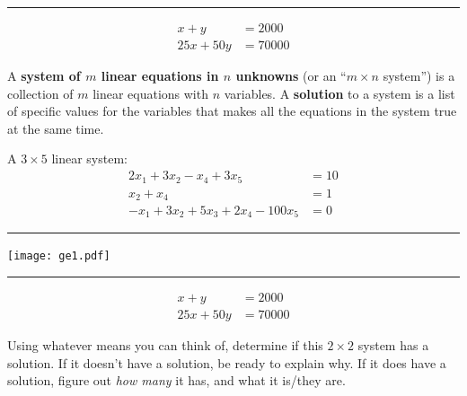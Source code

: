 \documentclass[
  letterpaper,
  DIV=11,
  numbers=noendperiod]{scrartcl}
\begin{document}
\begin{center}\rule{0.5\linewidth}{0.5pt}\end{center}

\[\begin{align*}
x + y &= 2000 \\
25x + 50y &= 70000
\end{align*}\]

\begin{tcolorbox}[enhanced jigsaw, colbacktitle=quarto-callout-note-color!10!white, left=2mm, bottomrule=.15mm, toprule=.15mm, coltitle=black, opacityback=0, colframe=quarto-callout-note-color-frame, colback=white, arc=.35mm, toptitle=1mm, titlerule=0mm, rightrule=.15mm, leftrule=.75mm, breakable, bottomtitle=1mm, title=\textcolor{quarto-callout-note-color}{\faInfo}\hspace{0.5em}{System of equations}, opacitybacktitle=0.6]

A \textbf{system of \(m\) linear equations in \(n\) unknowns} (or an
``\(m \times n\) system'') is a collection of \(m\) linear equations
with \(n\) variables. A \textbf{solution} to a system is a list of
specific values for the variables that makes all the equations in the
system true at the same time.

\end{tcolorbox}

A \(3 \times 5\) linear system: \[\begin{align*}
2x_1 + 3x_2 - x_4 + 3x_5 &= 10 \\
x_2 + x_4 &= 1 \\
-x_1 + 3x_2 + 5x_3 + 2x_4 - 100x_5 &= 0 
\end{align*}\]

\begin{center}\rule{0.5\linewidth}{0.5pt}\end{center}

\texttt{[image: ge1.pdf]}

\begin{center}\rule{0.5\linewidth}{0.5pt}\end{center}

\[\begin{align*}
x + y &= 2000 \\
25x + 50y &= 70000
\end{align*}\]

\begin{tcolorbox}[enhanced jigsaw, colbacktitle=quarto-callout-important-color!10!white, left=2mm, bottomrule=.15mm, toprule=.15mm, coltitle=black, opacityback=0, colframe=quarto-callout-important-color-frame, colback=white, arc=.35mm, toptitle=1mm, titlerule=0mm, rightrule=.15mm, leftrule=.75mm, breakable, bottomtitle=1mm, title=\textcolor{quarto-callout-important-color}{\faExclamation}\hspace{0.5em}{Activity}, opacitybacktitle=0.6]

Using whatever means you can think of, determine if this \(2 \times 2\)
system has a solution. If it doesn't have a solution, be ready to
explain why. If it does have a solution, figure out \emph{how many} it
has, and what it is/they are.

\end{tcolorbox}
\end{document}
